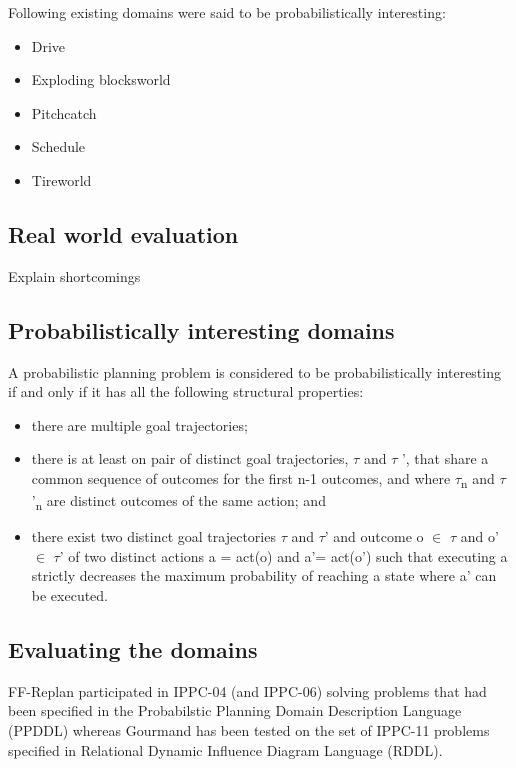 \documentclass[runningheads,a4paper]{llncs}
\begin{document}
Following existing domains were said to be probabilistically interesting:
\begin{itemize}
	\item Drive
	\item Exploding blocksworld
	\item Pitchcatch
	\item Schedule
	\item Tireworld
\end{itemize}


\subsection{Real world evaluation}

Explain shortcomings


\subsection{Probabilistically interesting domains}
A probabilistic planning problem is considered to be probabilistically interesting if and only if it has all the following structural properties:


\begin{itemize}
	\item there are multiple goal trajectories;
	\item there is at least on pair of distinct goal trajectories, $\tau$ and $\tau$ ', that share a common sequence of outcomes for the first n-1 outcomes, and where $\tau$\textsubscript{n} and $\tau$'\textsubscript{n} are distinct outcomes of the same action; and
	\item there exist two distinct goal trajectories $\tau$ and $\tau$' and outcome o $\in$ $\tau$ and o' $\in$ $\tau$' of two distinct actions a = act(o) and a'= act(o') such that executing a strictly decreases the maximum probability of reaching a state where a' can be executed.
\end{itemize}


\subsection{Evaluating the domains}
FF-Replan participated in IPPC-04 (and IPPC-06) solving problems that had been specified in the Probabilstic Planning Domain Description Language (PPDDL) whereas Gourmand has been tested on the set of IPPC-11 problems specified in Relational Dynamic Influence Diagram Language (RDDL)\cite{sanner2008rddl}.
\end{document}

